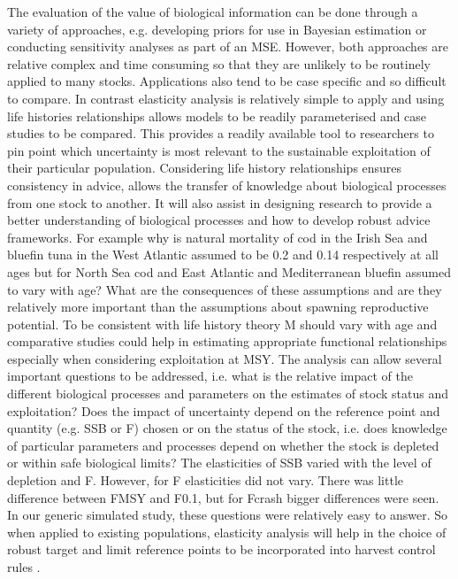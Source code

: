 \documentclass{pnastwo}
\begin{document}
\begin{article}
The evaluation of the value of biological information can be done through a variety of approaches, e.g. developing priors for use in Bayesian estimation or conducting sensitivity analyses as part of an MSE. However, both approaches are relative complex and time consuming so that they are unlikely to be routinely applied to many stocks. Applications also tend to be case speciﬁc and so diﬃcult to compare. In contrast elasticity analysis is relatively simple to apply and using life histories relationships allows models to be readily parameterised and case studies to be compared. This provides a readily available tool to researchers to pin point which uncertainty is most relevant to the sustainable exploitation of their particular population.
Considering life history relationships ensures consistency in advice, allows the transfer of knowledge about biological processes from one stock to another. It will also assist in designing research to provide a better understanding of biological processes and how to develop robust advice frameworks. For example why is natural mortality of cod in the Irish Sea and blueﬁn tuna in the West Atlantic assumed to be 0.2 and 0.14 respectively at all ages but for North Sea cod and East Atlantic and Mediterranean blueﬁn assumed to vary with age? What are the consequences of these assumptions and are they relatively more important than the assumptions about spawning reproductive potential. To be consistent with life history theory M should vary with age and comparative studies could help in estimating appropriate functional relationships especially when considering exploitation at MSY.
The analysis can allow several important questions to be addressed, i.e. what is the relative impact of the diﬀerent biological processes and parameters on the estimates of stock status and exploitation? Does the impact of uncertainty depend on the reference point and quantity (e.g. SSB or F) chosen or on the status of the stock, i.e. does knowledge of particular parameters and processes depend on whether the stock is depleted or within safe biological limits? The elasticities of SSB varied with the level of depletion and F. However, for F elasticities did not vary. There was little diﬀerence between FMSY and F0.1, but for Fcrash bigger diﬀerences were seen. In our generic simulated study, these questions were relatively easy to answer. So when applied to existing populations, elasticity analysis  will help in the choice of robust target and limit reference points to be incorporated into harvest control rules .


\end{article}
\end{document}
